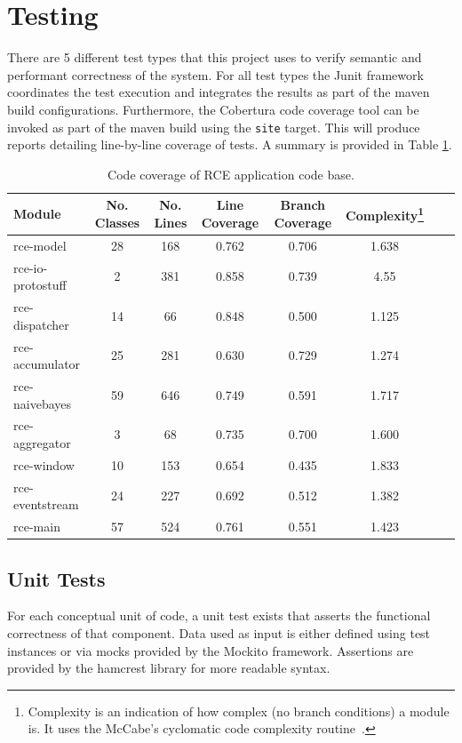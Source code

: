 \documentclass[a4paper,11pt]{scrreprt}
\begin{document}
\section{Testing}
There are 5 different test types that this project uses to verify semantic and performant correctness of the system. For all test types the Junit framework coordinates the test execution and integrates the results as part of the maven build configurations. Furthermore, the Cobertura code coverage tool can be invoked as part of the maven build using the \verb|site| target. This will produce reports detailing line-by-line coverage of tests. A summary is provided in Table \ref{tab:coverage}.
\begin{table}[h!]
\begin{tabular}{l*{6}{c}r}
Module              & No. Classes & No. Lines & Line Coverage & Branch Coverage & Complexity\footnote{Complexity is an indication of how complex (no branch conditions) a module is. It uses the McCabe's cyclomatic code complexity routine~\cite{mccabecc}.} \\
\hline
rce-model & 28 & 168 & 0.762 & 0.706 & 1.638 \\
rce-io-protostuff & 2 & 381 & 0.858 & 0.739 & 4.55 \\
rce-dispatcher & 14 & 66 & 0.848 & 0.500 & 1.125 \\
rce-accumulator & 25 & 281 & 0.630 & 0.729 & 1.274 \\
rce-naivebayes & 59 & 646 & 0.749 & 0.591 & 1.717 \\
rce-aggregator & 3 & 68 & 0.735 & 0.700 & 1.600 \\
rce-window & 10 & 153 & 0.654 & 0.435 & 1.833 \\
rce-eventstream & 24 & 227 & 0.692 & 0.512 & 1.382 \\
rce-main & 57 & 524 & 0.761 & 0.551 & 1.423 \\
\end{tabular}
\caption{Code coverage of RCE application code base.}
\label{tab:coverage}
\end{table}

\subsection{Unit Tests}
For each conceptual unit of code, a unit test exists that asserts the functional correctness of that component. Data used as input is either defined using test instances or via mocks provided by the Mockito framework. Assertions are provided by the hamcrest library for more readable syntax.
\end{document}

